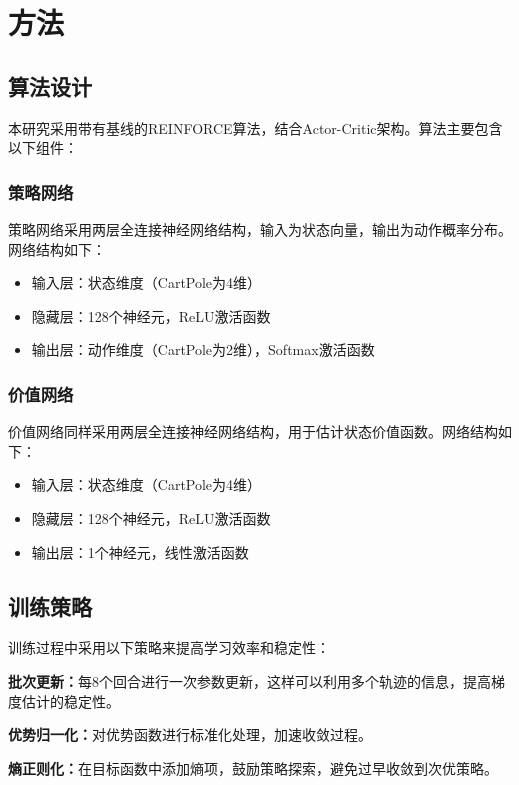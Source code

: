 \documentclass[12pt,a4paper]{article}
\begin{document}
\section{方法}

\subsection{算法设计}

本研究采用带有基线的REINFORCE算法，结合Actor-Critic架构。算法主要包含以下组件：

\subsubsection{策略网络}

策略网络采用两层全连接神经网络结构，输入为状态向量，输出为动作概率分布。网络结构如下：
\begin{itemize}[itemsep=0pt]
    \item 输入层：状态维度（CartPole为4维）
    \item 隐藏层：128个神经元，ReLU激活函数
    \item 输出层：动作维度（CartPole为2维），Softmax激活函数
\end{itemize}

\subsubsection{价值网络}

价值网络同样采用两层全连接神经网络结构，用于估计状态价值函数。网络结构如下：
\begin{itemize}[itemsep=0pt]
    \item 输入层：状态维度（CartPole为4维）
    \item 隐藏层：128个神经元，ReLU激活函数
    \item 输出层：1个神经元，线性激活函数
\end{itemize}

\subsection{训练策略}

训练过程中采用以下策略来提高学习效率和稳定性：

\textbf{批次更新：}每8个回合进行一次参数更新，这样可以利用多个轨迹的信息，提高梯度估计的稳定性。

\textbf{优势归一化：}对优势函数进行标准化处理，加速收敛过程。

\textbf{熵正则化：}在目标函数中添加熵项，鼓励策略探索，避免过早收敛到次优策略。
\end{document}
